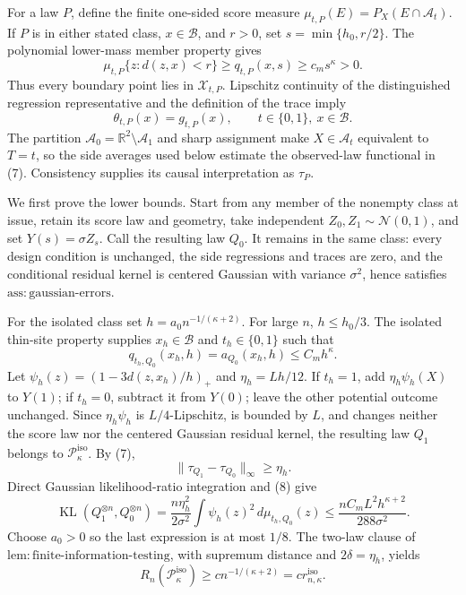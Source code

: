 For a law \(P\), define the finite one-sided score measure \(\mu_{t,P}(E)=P_X(E\cap\mathcal A_t)\).  If \(P\) is in either stated class, \(x\in\mathcal B\), and \(r>0\), set \(s=\min\{h_0,r/2\}\).  The polynomial lower-mass member property gives
\[
 \mu_{t,P}\{z:d(z,x)<r\}\ge q_{t,P}(x,s)\ge c_ms^\kappa>0. \tag{6}
\]
Thus every boundary point lies in \(\mathcal X_{t,P}\).  Lipschitz continuity of the distinguished regression representative and the definition of the trace imply
\[
 \theta_{t,P}(x)=g_{t,P}(x),\qquad t\in\{0,1\},\ x\in\mathcal B. \tag{7}
\]
The partition \(\mathcal A_0=\mathbb R^2\setminus\mathcal A_1\) and sharp assignment make \(X\in\mathcal A_t\) equivalent to \(T=t\), so the side averages used below estimate the observed-law functional in (7).  Consistency supplies its causal interpretation as \(\tau_P\).

We first prove the lower bounds.  Start from any member of the nonempty class at issue, retain its score law and geometry, take independent \(Z_0,Z_1\sim\mathcal N(0,1)\), and set \(Y(s)=\sigma Z_s\).  Call the resulting law \(Q_0\).  It remains in the same class: every design condition is unchanged, the side regressions and traces are zero, and the conditional residual kernel is centered Gaussian with variance \(\sigma^2\), hence satisfies \(\mathrm{ass:gaussian\text{-}errors}\).

For the isolated class set \(h=a_0n^{-1/(\kappa+2)}\).  For large \(n\), \(h\le h_0/3\).  The isolated thin-site property supplies \(x_h\in\mathcal B\) and \(t_h\in\{0,1\}\) such that
\[
 q_{t_h,Q_0}(x_h,h)=a_{Q_0}(x_h,h)\le C_mh^\kappa. \tag{8}
\]
Let \(\psi_h(z)=(1-3d(z,x_h)/h)_+\) and \(\eta_h=Lh/12\).  If \(t_h=1\), add \(\eta_h\psi_h(X)\) to \(Y(1)\); if \(t_h=0\), subtract it from \(Y(0)\); leave the other potential outcome unchanged.  Since \(\eta_h\psi_h\) is \(L/4\)-Lipschitz, is bounded by \(L\), and changes neither the score law nor the centered Gaussian residual kernel, the resulting law \(Q_1\) belongs to \(\mathcal P_\kappa^{\mathrm{iso}}\).  By (7),
\[
 \|\tau_{Q_1}-\tau_{Q_0}\|_\infty\ge\eta_h. \tag{9}
\]
Direct Gaussian likelihood-ratio integration and (8) give
\[
 \operatorname{KL}(Q_1^{\otimes n},Q_0^{\otimes n})
 =\frac{n\eta_h^2}{2\sigma^2}\int\psi_h(z)^2\,d\mu_{t_h,Q_0}(z)
 \le \frac{nC_mL^2h^{\kappa+2}}{288\sigma^2}. \tag{10}
\]
Choose \(a_0>0\) so the last expression is at most \(1/8\).  The two-law clause of \(\mathrm{lem:finite\text{-}information\text{-}testing}\), with supremum distance and \(2\delta=\eta_h\), yields
\[
 R_n(\mathcal P_\kappa^{\mathrm{iso}})\ge c n^{-1/(\kappa+2)}=c r_{n,\kappa}^{\mathrm{iso}}. \tag{11}
\]

